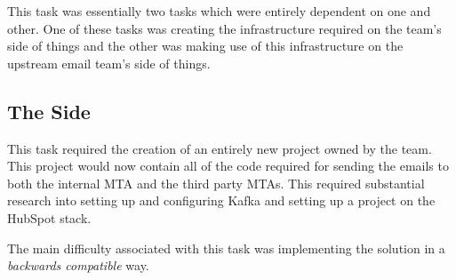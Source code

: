 This task was essentially two tasks which were entirely dependent on one and other. One of these tasks was creating the infrastructure required on the \team{} team's side of things and the other was making use of this infrastructure on the upstream email team's side of things.
\break

\subsection{The \team{} Side}
This task required the creation of an entirely new project owned by the \team{} team. This project would now contain all of the code required for sending the emails to both the internal MTA and the third party MTAs. This required substantial research into setting up and configuring Kafka and setting up a project on the HubSpot stack.

The main difficulty associated with this task was implementing the solution in a \textit{backwards compatible} way.  